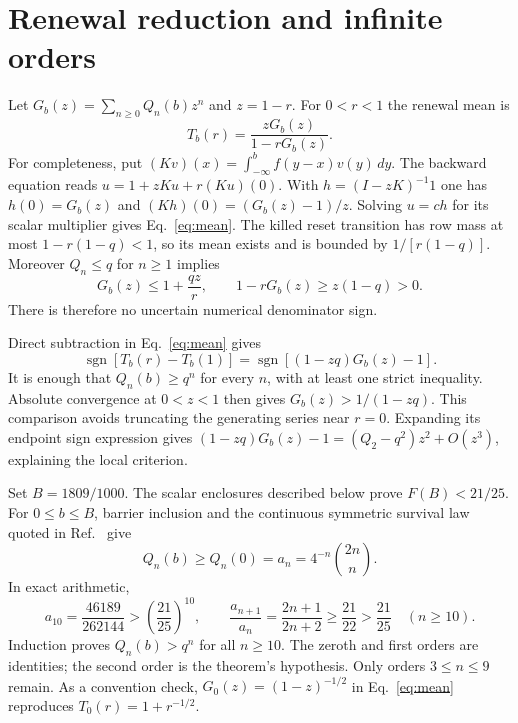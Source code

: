 \documentclass[11pt]{article}
\begin{document}
\section{Renewal reduction and infinite orders}
Let $G_b(z)=\sum_{n\ge0}Q_n(b)z^n$ and $z=1-r$. For $0<r<1$ the renewal
mean is \cite{radice}
\begin{equation}\label{eq:mean}
 T_b(r)=\frac{zG_b(z)}{1-rG_b(z)}.
\end{equation}
For completeness, put $(Kv)(x)=\int_{-\infty}^b f(y-x)v(y)\,dy$.
The backward equation reads $u=1+zKu+r(Ku)(0)$.
With $h=(I-zK)^{-1}1$ one has $h(0)=G_b(z)$ and
$(Kh)(0)=(G_b(z)-1)/z$. Solving $u=ch$ for its scalar multiplier gives
Eq.~\eqref{eq:mean}. The killed reset transition has row mass at most
$1-r(1-q)<1$, so its mean exists and is bounded by $1/[r(1-q)]$.
Moreover $Q_n\le q$ for $n\ge1$ implies
\begin{equation}
 G_b(z)\le1+\frac{qz}{r},\qquad 1-rG_b(z)\ge z(1-q)>0.
\end{equation}
There is therefore no uncertain numerical denominator sign.

Direct subtraction in Eq.~\eqref{eq:mean} gives
\begin{equation}\label{eq:sign}
 \operatorname{sgn}[T_b(r)-T_b(1)]
 =\operatorname{sgn}[(1-zq)G_b(z)-1].
\end{equation}
It is enough that $Q_n(b)\ge q^n$ for every $n$, with at least one strict
inequality. Absolute convergence at $0<z<1$ then gives
$G_b(z)>1/(1-zq)$. This comparison avoids truncating the generating series
near $r=0$. Expanding its endpoint sign expression gives
$(1-zq)G_b(z)-1=(Q_2-q^2)z^2+O(z^3)$, explaining the local criterion.

Set $B=1809/1000$. The scalar enclosures described below prove
$F(B)<21/25$. For $0\le b\le B$, barrier inclusion and the continuous
symmetric survival law quoted in Ref.~\cite{radice} give
\begin{equation}
 Q_n(b)\ge Q_n(0)=a_n=4^{-n}\binom{2n}{n}.
\end{equation}
In exact arithmetic,
\begin{equation}
 a_{10}=\frac{46189}{262144}>\left(\frac{21}{25}\right)^{10},\qquad
 \frac{a_{n+1}}{a_n}=\frac{2n+1}{2n+2}\ge\frac{21}{22}>\frac{21}{25}
 \quad(n\ge10).
\end{equation}
Induction proves $Q_n(b)>q^n$ for all $n\ge10$. The zeroth and first
orders are identities; the second order is the theorem's hypothesis.
Only orders $3\le n\le9$ remain. As a convention check, $G_0(z)=(1-z)^{-1/2}$
in Eq.~\eqref{eq:mean} reproduces $T_0(r)=1+r^{-1/2}$.
\end{document}

